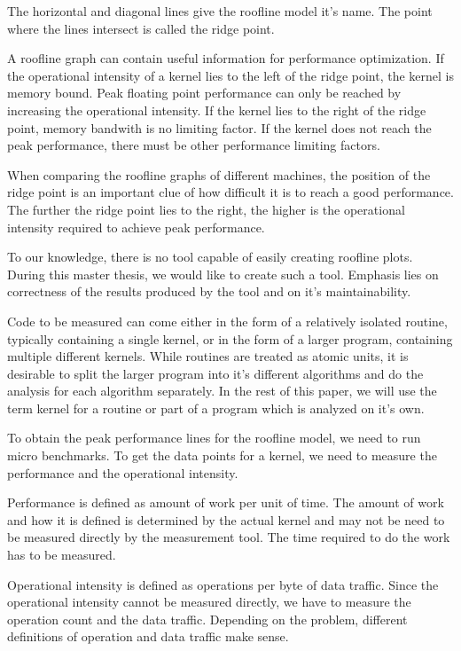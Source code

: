 \documentclass[a4paper,12pt]{article}
\begin{document}
The horizontal and diagonal lines give the roofline model it's name. The point
where the lines intersect is called the ridge point. 

A roofline graph can contain useful information for performance optimization. If
the operational intensity of a kernel lies to the left of the ridge point, the
kernel is memory bound. Peak floating point performance can only be reached by
increasing the operational intensity. If the kernel lies to the right of the
ridge point, memory bandwith is no limiting factor. If the kernel does not reach
the peak performance, there must be other performance limiting factors.

When comparing the roofline graphs of different machines, the position of the
ridge point is an important clue of how difficult it is to reach a good
performance. The further the ridge point lies to the right, the higher is the
operational intensity required to achieve peak performance. 

To our knowledge, there is no tool capable of easily creating roofline plots. During this master thesis, we would like to
create such a tool. Emphasis lies on correctness of the results produced by the
tool and on it's maintainability.

Code to be measured can come either in the form of a relatively isolated
routine, typically containing a single kernel, or in the form of a larger
program, containing multiple different kernels. While routines are treated as
atomic units, it is desirable to split the larger program into it's different
algorithms and do the analysis for each algorithm separately. In the rest of
this paper, we will use the term kernel for a routine or part of a program which
is analyzed on it's own.

To obtain the peak performance lines for the roofline model, we need to run
micro benchmarks. To get the data points for a kernel, we need to measure the
performance and the operational intensity. 

Performance is defined as amount of work per unit of time. The amount of work
and how it is defined is determined by the actual kernel and may not be need to
be measured directly by the measurement tool. The time required to do the work
has to be measured.

Operational intensity is defined as operations per byte of data traffic. Since
the operational intensity cannot be measured directly, we have to measure the
operation count and the data traffic. Depending on the problem, different
definitions of operation and data traffic make sense.
\end{document}
